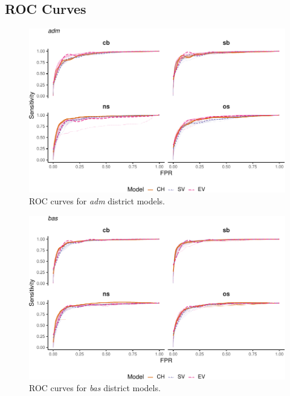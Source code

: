 \documentclass[a4paper,11pt]{article}
\begin{document}
\hypertarget{roc-curves}{%
\subsection*{ROC Curves}\label{roc-curves}}
\begin{figure}[H]

{\centering \includegraphics{thesis_files/figure-latex/appendix-auc-adm-1} 

}

\caption[ROC curves for \textit{adm} district models.]{ROC curves for \textit{adm} district models.}\label{fig:appendix-auc-adm}
\end{figure}
\begin{figure}[H]

{\centering \includegraphics{thesis_files/figure-latex/appendix-auc-bas-1} 

}

\caption[ROC curves for \textit{bas} district models.]{ROC curves for \textit{bas} district models.}\label{fig:appendix-auc-bas}
\end{figure}
\end{document}
